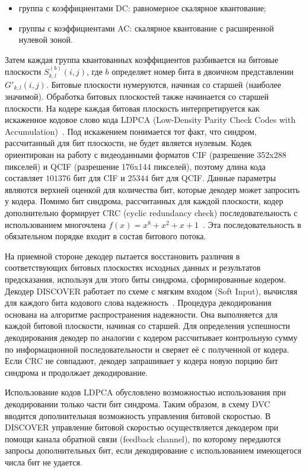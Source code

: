 \begin{itemize}
\item группа с коэффициентами DC: равномерное скалярное квантование;
\item группы с коэффициентами AC: скалярное квантование с расширенной нулевой зоной.
\end{itemize}

Затем каждая группа квантованных коэффициентов разбивается на битовые плоскости $S_{k,l}^{(b)}(i,j)$, где $b$ определяет номер бита в двоичном представлении $G'_{k,l}(i,j)$. Битовые плоскости нумеруются, начиная со старшей (наиболее значимой). Обработка битовых плоскостей также начинается со старшей плоскости. На кодере каждая битовая плоскость интерпретируется как искаженное кодовое слово кода LDPCA (Low-Density Parity Check Codes with Accumulation)~\cite{Varodayan2005}. Под искажением понимается тот факт, что синдром, рассчитанный для бит плоскости, не будет является нулевым. Кодек ориентирован на работу с видеоданными форматов CIF (разрешение 352x288 пикселей) и QCIF (разрешение 176x144 пикселей), поэтому длина кода составляет $101376$ бит для CIF и $25344$ бит для QCIF. Данные параметры являются верхней оценкой для количества бит, которые декодер может запросить у кодера. Помимо бит синдрома, рассчитанных для каждой плоскости, кодер дополнительно формирует CRC (cyclic redundancy check) последовательность с использованием многочлена $f(x)=x^8+x^2+x+1$~\cite{Kubasov2007}. Эта последовательность в обязательном порядке входит в состав битового потока.

На приемной стороне декодер пытается восстановить различия в соответствующих битовых плоскостях исходных данных и результатов предсказания, используя для этого биты синдрома, сформированные кодером. Декодер DISCOVER работает по схеме с мягким входом (Soft Input), вычисляя для каждого бита кодового слова надежность~\cite{Kubasov2007}. Процедура декодирования основана на алгоритме распространения надежности. Она выполняется для каждой битовой плоскости, начиная со старшей. Для определения успешности декодирования декодер по аналогии с кодером рассчитывает контрольную сумму по информационной последовательности и сверяет её с полученной от кодера. Если CRC не совпадают, декодер запрашивает у кодера новую порцию бит синдрома и продолжает декодирование.

Использование кодов LDPCA обусловлено возможностью использования при декодировании только части бит синдрома. Таким образом, в схему DVC вводится дополнительная возможность управления битовой скоростью. В DISCOVER управление битовой скоростью осуществляется декодером при помощи канала обратной связи (feedback channel), по которому передаются запросы дополнительных бит, если декодирование с использованием имеющегося числа бит не удается.


